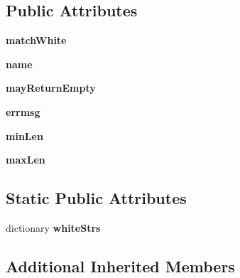 \subsection*{Public Attributes}
\begin{DoxyCompactItemize}
\item 
\mbox{\label{classsetuptools_1_1__vendor_1_1pyparsing_1_1_white_a33a16c4f391cc1d6d487ad4c2a218cd8}} 
{\bfseries match\+White}
\item 
\mbox{\label{classsetuptools_1_1__vendor_1_1pyparsing_1_1_white_a6c7eb248e66fdaa41b7c579d4c17b723}} 
{\bfseries name}
\item 
\mbox{\label{classsetuptools_1_1__vendor_1_1pyparsing_1_1_white_ad3557fae3b42c92fd87d31a285807949}} 
{\bfseries may\+Return\+Empty}
\item 
\mbox{\label{classsetuptools_1_1__vendor_1_1pyparsing_1_1_white_a122cbc023457334667b7c1ca5c9144af}} 
{\bfseries errmsg}
\item 
\mbox{\label{classsetuptools_1_1__vendor_1_1pyparsing_1_1_white_ae4039efae5150414812019c3a13c5b04}} 
{\bfseries min\+Len}
\item 
\mbox{\label{classsetuptools_1_1__vendor_1_1pyparsing_1_1_white_ac0dd6bda9bd4f96789e1b655a8f3c760}} 
{\bfseries max\+Len}
\end{DoxyCompactItemize}
\subsection*{Static Public Attributes}
\begin{DoxyCompactItemize}
\item 
dictionary {\bfseries white\+Strs}
\end{DoxyCompactItemize}
\subsection*{Additional Inherited Members}


